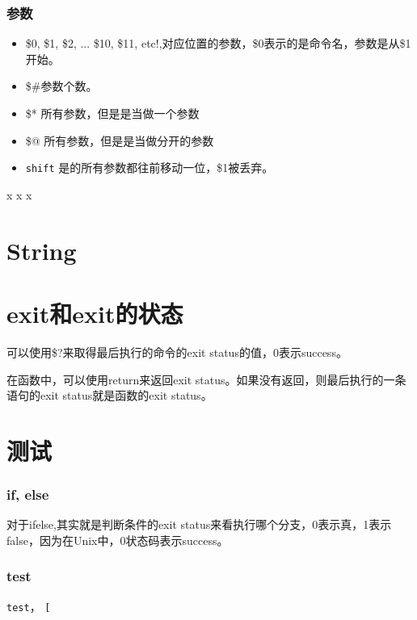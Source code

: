 \subsubsection{参数}

\begin{itemize}
\item \$0, \$1, \$2, ... \${10}, \${11}, etc!,对应位置的参数，\$0表示的是命令名，参数是从\$1开始。
\item \$\#参数个数。
\item \$* 所有参数，但是是当做一个参数
\item \$@ 所有参数，但是是当做分开的参数
\item \lstinline$shift$ 是的所有参数都往前移动一位，\$1被丢弃。
\end{itemize}

\begin{Command-Line}[\$*和\$@的区别]
x
x
x
\end{Command-Line}

\section{String}

\section{exit和exit的状态}

可以使用\$?来取得最后执行的命令的exit status的值，0表示success。


在函数中，可以使用return来返回exit status。如果没有返回，则最后执行的一条语句的exit status就是函数的exit status。

\section{测试}

\subsubsection{if, else}

对于ifelse,其实就是判断条件的exit status来看执行哪个分支，0表示真，1表示false，因为在Unix中，0状态码表示success。

\subsubsection{test}

\lstinline$test$， \lstinline$[$

